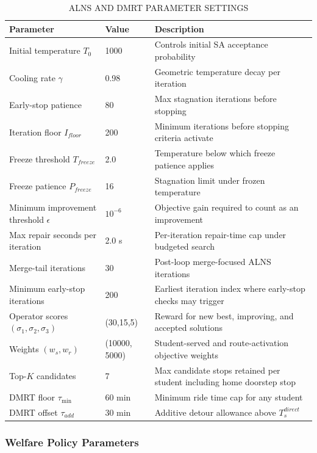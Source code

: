 \documentclass[journal]{IEEEtran}
\begin{document}
\begin{table}[t]
\caption{ALNS AND DMRT PARAMETER SETTINGS}
\label{tab:parameter_setting}
\centering
\begin{tabular}{p{2.6cm}p{1cm}p{3.4cm}}
\toprule
\textbf{Parameter} & \textbf{Value} & \textbf{Description} \\
\midrule
Initial temperature $T_0$ & 1000 & Controls initial SA 
acceptance probability \\
Cooling rate $\gamma$ & 0.98 & Geometric temperature decay 
per iteration \\
Early-stop patience & 80 & Max stagnation iterations 
before stopping \\
Iteration floor $I_{floor}$ & 200 & Minimum iterations 
before stopping criteria activate \\
Freeze threshold $T_{freeze}$ & 2.0 & Temperature below 
which freeze patience applies \\
Freeze patience $P_{freeze}$ & 16 & Stagnation limit 
under frozen temperature \\
Minimum improvement threshold $\epsilon$ & $10^{-6}$ & Objective gain required to count as an improvement \\
Max repair seconds per iteration & 2.0 s & Per-iteration repair-time cap under budgeted search \\
Merge-tail iterations & 30 & Post-loop merge-focused ALNS iterations \\
Minimum early-stop iterations & 200 & Earliest iteration index where early-stop checks may trigger \\
Operator scores $(\sigma_1,\sigma_2,\sigma_3)$ & (30,15,5) & 
Reward for new best, improving, and accepted solutions \\
Weights $(w_s, w_r)$ & (10000, 5000) & Student-served and 
route-activation objective weights \\
Top-$K$ candidates & 7 & Max candidate stops 
retained per student including home doorstep stop \\
DMRT floor $\tau_{\min}$ & 60 min & Minimum ride time 
cap for any student \\
DMRT offset $\tau_{add}$ & 30 min & Additive detour 
allowance above $T^{direct}_s$ \\
\bottomrule
\end{tabular}
\end{table}

\subsubsection{Welfare Policy Parameters}
\end{document}
